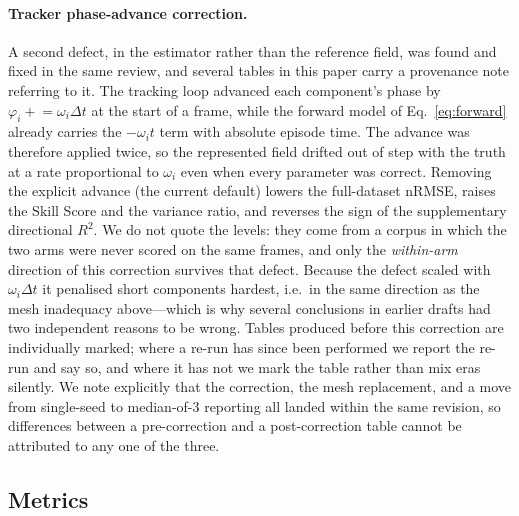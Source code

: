 \documentclass[review]{elsarticle}
\begin{document}
\paragraph{Tracker phase-advance correction.}
A second defect, in the estimator rather than the reference field, was
found and fixed in the same review, and several tables in this paper carry
a provenance note referring to it.  The tracking loop advanced each
component's phase by $\varphi_i \mathrel{+}= \omega_i \Delta t$ at the
start of a frame, while the forward model of Eq.~\eqref{eq:forward}
already carries the $-\omega_i t$ term with absolute episode time.  The
advance was therefore applied twice, so the represented field drifted out
of step with the truth at a rate proportional to $\omega_i$ even when
every parameter was correct.  Removing the explicit advance
(the current default) lowers the full-dataset nRMSE, raises the Skill Score
and the variance ratio, and reverses the sign of the supplementary directional
$R^2$. We do not quote the levels: they come from a corpus in which the two arms
were never scored on the same frames, and only the \emph{within-arm} direction of
this correction survives that defect.  Because the defect scaled with
$\omega_i \Delta t$ it penalised short components hardest, i.e.\ in the
same direction as the mesh inadequacy above---which is why several
conclusions in earlier drafts had two independent reasons to be wrong.
Tables produced before this correction are individually marked; where a
re-run has since been performed we report the re-run and say so, and
where it has not we mark the table rather than mix eras silently.
We note explicitly that the correction, the mesh replacement, and a move
from single-seed to median-of-3 reporting all landed within the same
revision, so differences between a pre-correction and a post-correction
table cannot be attributed to any one of the three.

\subsection{Metrics}
\label{sec:metrics}
\end{document}
